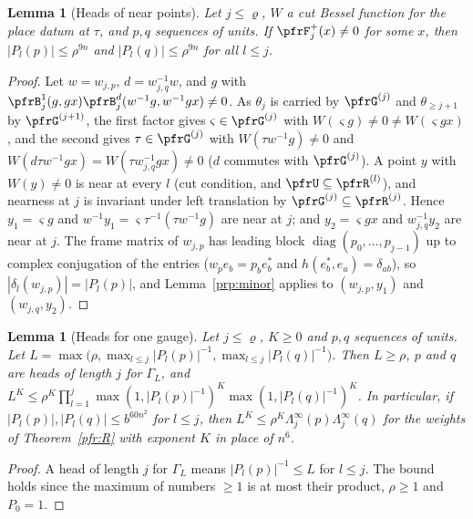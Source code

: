 \documentclass[10pt]{amsart}
\newtheorem{lemma}[theorem]{Lemma}
\theoremstyle{definition}
\theoremstyle{remark}
\begin{document}
\begin{lemma}[Heads of near points]\label{prp:headsupport}
Let $j\le\varrho$, $W$ a cut Bessel function for the place datum at $\tau$, and $p,q$ sequences of units.
If $\pfrF^+_j(x)\ne0$ for some $x$, then $|P_l(p)|\le\rho^{9n}$ and $|P_l(q)|\le\rho^{9n}$ for all $l\le j$.
\end{lemma}
\begin{proof}
Let $w=w_{j,p}$, $d=w_{j,q}^{-1}w$, and $g$ with $\pfrB^1_j(g,gx)\pfrB^d_j(w^{-1}g,w^{-1}gx)\ne0$. As $\theta_j$
is carried by $\pfrG^{(j)}$ and $\theta_{\ge j+1}$ by $\pfrG^{(j+1)}$, the first factor gives $\varsigma\in\pfrG^{(j)}$
with $W(\varsigma g)\ne0\ne W(\varsigma gx)$, and the second gives $\tau\in\pfrG^{(j)}$ with $W(\tau w^{-1}g)\ne0$
and $W(d\tau w^{-1}gx)=W(\tau w_{j,q}^{-1}gx)\ne0$ ($d$ commutes with $\pfrG^{(j)}$). A point $y$ with $W(y)\ne0$
is near at every $l$ (cut condition, and $\pfrU\subseteq\pfrR^{(l)}$), and nearness at $j$ is invariant under left
translation by $\pfrG^{(j)}\subseteq\pfrR^{(j)}$. Hence $y_1=\varsigma g$ and $w^{-1}y_1=\varsigma\tau^{-1}(\tau
w^{-1}g)$ are near at $j$; and $y_2=\varsigma gx$ and $w_{j,q}^{-1}y_2$ are near at $j$. The frame matrix of
$w_{j,p}$ has leading block $\operatorname{diag}(p_0,\dots,p_{j-1})$ up to complex conjugation of the
entries ($w_pe_b=p_be_b^*$ and $h(e_b^*,e_a)=\delta_{ab}$), so $|\delta_l(w_{j,p})|=|P_l(p)|$, and
Lemma~\ref{prp:minor} applies to $(w_{j,p},y_1)$ and $(w_{j,q},y_2)$.
\end{proof}

\begin{lemma}[Heads for one gauge]\label{prp:exgauge}
Let $j\le\varrho$, $K\ge0$ and $p,q$ sequences of units. Let $L=\max\bigl(\rho,\allowbreak \max_{l\le j}|P_l(p)|^{-1},
\allowbreak \max_{l\le j}|P_l(q)|^{-1}\bigr)$. Then $L\ge\rho$, $p$ and $q$ are heads of length $j$ for $\Gamma_L$, and
$L^K\le\rho^K\prod_{l=1}^j\max(1,|P_l(p)|^{-1})^K\max(1,|P_l(q)|^{-1})^K$. In particular, if
$|P_l(p)|,|P_l(q)|\le b^{60n^2}$ for $l\le j$, then $L^K\le\rho^K\Lambda^\infty_j(p)\Lambda^\infty_j(q)$ for the
weights of Theorem~\ref{pfr:R} with exponent $K$ in place of $n^6$.
\end{lemma}
\begin{proof}
A head of length $j$ for $\Gamma_L$ means $|P_l(p)|^{-1}\le L$ for $l\le j$. The bound holds since the maximum of
numbers $\ge1$ is at most their product, $\rho\ge1$ and $P_0=1$.
\end{proof}
\end{document}
